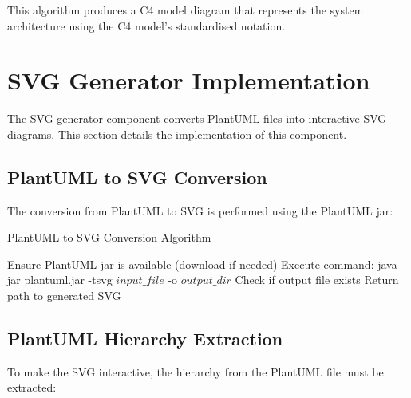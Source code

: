 \documentclass[a4paper,12pt]{article}
\begin{document}
This algorithm produces a C4 model diagram that represents the system architecture using the C4 model's standardised notation.

\section{SVG Generator Implementation}

The SVG generator component converts PlantUML files into interactive SVG diagrams. This section details the implementation of this component.

\subsection{PlantUML to SVG Conversion}

The conversion from PlantUML to SVG is performed using the PlantUML jar:

\begin{algorithm}
\caption{PlantUML to SVG Conversion Algorithm}
\begin{algorithmic}[1]
    \State Ensure PlantUML jar is available (download if needed)
    \State Execute command: java -jar plantuml.jar -tsvg $input\_file$ -o $output\_dir$
    \State Check if output file exists
    \State Return path to generated SVG
\EndProcedure
\end{algorithmic}
\end{algorithm}

\subsection{PlantUML Hierarchy Extraction}

To make the SVG interactive, the hierarchy from the PlantUML file must be extracted:
\end{document}
